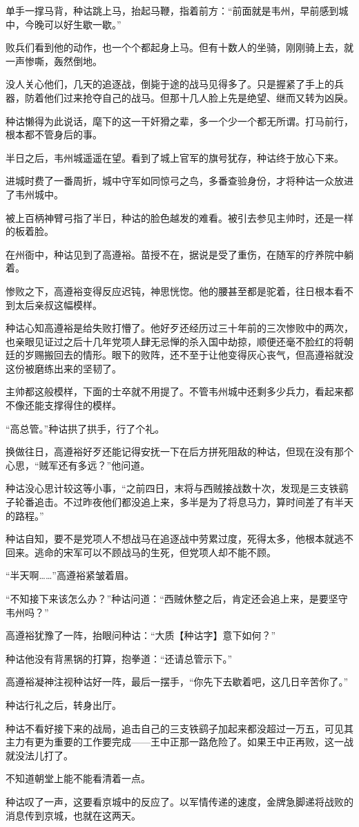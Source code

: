 单手一撑马背，种诂跳上马，抬起马鞭，指着前方：“前面就是韦州，早前感到城中，今晚可以好生歇一歇。”

败兵们看到他的动作，也一个个都起身上马。但有十数人的坐骑，刚刚骑上去，就一声惨嘶，轰然倒地。

没人关心他们，几天的追逐战，倒毙于途的战马见得多了。只是握紧了手上的兵器，防着他们过来抢夺自己的战马。但那十几人脸上先是绝望、继而又转为凶戾。

种诂懒得为此说话，麾下的这一干奸猾之辈，多一个少一个都无所谓。打马前行，根本都不管身后的事。

半日之后，韦州城遥遥在望。看到了城上官军的旗号犹存，种诂终于放心下来。

进城时费了一番周折，城中守军如同惊弓之鸟，多番查验身份，才将种诂一众放进了韦州城中。

被上百柄神臂弓指了半日，种诂的脸色越发的难看。被引去参见主帅时，还是一样的板着脸。

在州衙中，种诂见到了高遵裕。苗授不在，据说是受了重伤，在随军的疗养院中躺着。

惨败之下，高遵裕变得反应迟钝，神思恍惚。他的腰甚至都是驼着，往日根本看不到太后亲叔这幅模样。

种诂心知高遵裕是给失败打懵了。他好歹还经历过三十年前的三次惨败中的两次，也亲眼见证过之后十几年党项人肆无忌惮的杀入国中劫掠，顺便还毫不脸红的将朝廷的岁赐搬回去的情形。眼下的败阵，还不至于让他变得灰心丧气，但高遵裕就没这份被磨练出来的坚韧了。

主帅都这般模样，下面的士卒就不用提了。不管韦州城中还剩多少兵力，看起来都不像还能支撑得住的模样。

“高总管。”种诂拱了拱手，行了个礼。

换做往日，高遵裕好歹还能记得安抚一下在后方拼死阻敌的种诂，但现在没有那个心思，“贼军还有多远？”他问道。

种诂没心思计较这等小事，“之前四日，末将与西贼接战数十次，发现是三支铁鹞子轮番追击。不过昨夜他们都没追上来，多半是为了将息马力，算时间差了有半天的路程。”

种诂自知，要不是党项人不想战马在追逐战中劳累过度，死得太多，他根本就逃不回来。逃命的宋军可以不顾战马的生死，但党项人却不能不顾。

“半天啊……”高遵裕紧皱着眉。

“不知接下来该怎么办？”种诂问道：“西贼休整之后，肯定还会追上来，是要坚守韦州吗？”

高遵裕犹豫了一阵，抬眼问种诂：“大质【种诂字】意下如何？”

种诂他没有背黑锅的打算，抱拳道：“还请总管示下。”

高遵裕凝神注视种诂好一阵，最后一摆手，“你先下去歇着吧，这几日辛苦你了。”

种诂行礼之后，转身出厅。

种诂不看好接下来的战局，追击自己的三支铁鹞子加起来都没超过一万五，可见其主力有更为重要的工作要完成——王中正那一路危险了。如果王中正再败，这一战就没法儿打了。

不知道朝堂上能不能看清着一点。

种诂叹了一声，这要看京城中的反应了。以军情传递的速度，金牌急脚递将战败的消息传到京城，也就在这两天。

